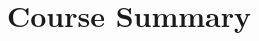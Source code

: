 

\title{Course Summary}

	\maketitle	
\begin{comment}
\begin{frame}\frametitle{Introduction}
\begin{itemize}
\item Modern cryptography secures information, transactions and computations.
\item Kerckhoffs's principle \& Open cryptographic design.
\item Caesar's, shift, Mono-Alphabetic sub., Vigen\`{e}re.
\item Brute force, letter frequency, Kasiski's, IC.
\item Sufficient key space principle.
		\item Arbitrary adversary principle.
		\item Rigorously proven security.
	\end{itemize}
\end{frame}
\begin{frame}\frametitle{Perfect Secrets}
\begin{itemize}
\item Perfect secrecy $=$ Perfect indistinguishability $=$ Adversarial indistinguishability.
\item Perfect secrecy is attainable. The One-Time Pad (Vernam's cipher).
\item Shannon's theorem.
\end{itemize}
\end{frame}
\begin{frame}\frametitle{Computational Security vs. Info.-theoretical Security}
\begin{center}
\begin{tabular}{|c|c|c|} \hline
                      & \textbf{Computational} & \textbf{Info.-theoretical} \\ \hline
\textbf{Adversary}    & \textsc{ppt} & no limited \\ 
                      & eavesdropping & eavesdropping\\ \hline 
\textbf{Definition}   & indistinguishable & indistinguishable \\ 
                      & $\frac{1}{2} + \mathsf{negl}$ & $\frac{1}{2}$ \\ \hline
\textbf{Assumption}   & pseudorandom & random   \\ \hline

\end{comment}
